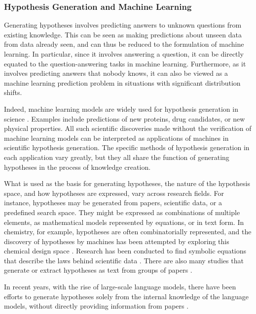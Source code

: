 \subsubsection{Hypothesis Generation and Machine Learning}

Generating hypotheses involves predicting answers to unknown questions from existing knowledge. This can be seen as making predictions about unseen data from data already seen, and can thus be reduced to the formulation of machine learning. In particular, since it involves answering a question, it can be directly equated to the question-answering tasks in machine learning. Furthermore, as it involves predicting answers that nobody knows, it can also be viewed as a machine learning prediction problem in situations with significant distribution shifts.

Indeed, machine learning models are widely used for hypothesis generation in science \cite{xu2021artificial,zhang2023artificial,wang2023scientific}. Examples include predictions of new proteins, drug candidates, or new physical properties. All such scientific discoveries made without the verification of machine learning models can be interpreted as applications of machines in scientific hypothesis generation. The specific methods of hypothesis generation in each application vary greatly, but they all share the function of generating hypotheses in the process of knowledge creation.

What is used as the basis for generating hypotheses, the nature of the hypothesis space, and how hypotheses are expressed, vary across research fields. For instance, hypotheses may be generated from papers, scientific data, or a predefined search space. They might be expressed as combinations of multiple elements, as mathematical models represented by equations, or in text form. In chemistry, for example, hypotheses are often combinatorially represented, and the discovery of hypotheses by machines has been attempted by exploring this chemical design space \cite{coley2020autonomous}. Research has been conducted to find symbolic equations that describe the laws behind scientific data \cite{kramer2023automated}. There are also many studies that generate or extract hypotheses as text from groups of papers \cite{kang2022augmenting,chan2018solvent,wang2023learning,xu2023exploring,yang2023large}.

In recent years, with the rise of large-scale language models, there have been efforts to generate hypotheses solely from the internal knowledge of the language models, without directly providing information from papers \cite{park2023can,ai4science2023impact}.

